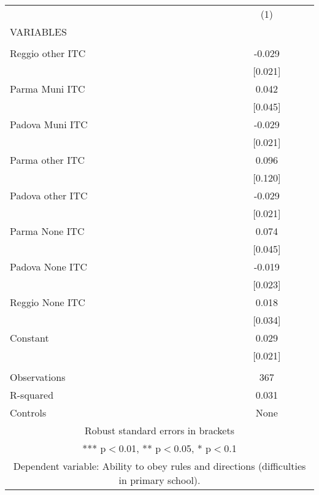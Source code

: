 \begin{tabular}{lc} \hline
 & (1) \\
VARIABLES &  \\ \hline
 &  \\
Reggio other ITC & -0.029 \\
 & [0.021] \\
Parma Muni ITC & 0.042 \\
 & [0.045] \\
Padova Muni ITC & -0.029 \\
 & [0.021] \\
Parma other ITC & 0.096 \\
 & [0.120] \\
Padova other ITC & -0.029 \\
 & [0.021] \\
Parma None ITC & 0.074 \\
 & [0.045] \\
Padova None ITC & -0.019 \\
 & [0.023] \\
Reggio None ITC & 0.018 \\
 & [0.034] \\
Constant & 0.029 \\
 & [0.021] \\
 &  \\
Observations & 367 \\
R-squared & 0.031 \\
 Controls & None \\ \hline
\multicolumn{2}{c}{ Robust standard errors in brackets} \\
\multicolumn{2}{c}{ *** p$<$0.01, ** p$<$0.05, * p$<$0.1} \\
\multicolumn{2}{c}{ Dependent variable: Ability to obey rules and directions (difficulties in primary school).} \\
\end{tabular}
